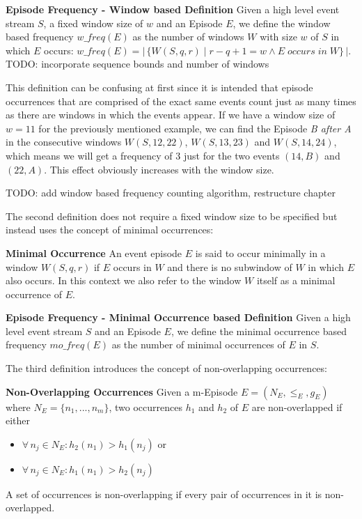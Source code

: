 \begin{mydef}
\textbf{Episode Frequency - Window based Definition} Given a high level event stream $S$, a fixed window size of $w$ and an Episode $E$, we define the window based frequency $w\_freq(E)$ as the number of windows $W$ with size $w$ of $S$ in which $E$ occurs: $w\_freq(E) = |\,\{W(S,q,r) \mid r-q+1 = w \land E \;occurs\; in\; W \}\,|$. TODO: incorporate sequence bounds and number of windows
\end{mydef}

This definition can be confusing at first since it is intended that episode occurrences that are comprised of the exact same events count just as many times as there are windows in which the events appear. If we have a window size of $w=11$ for the previously mentioned example, we can find the Episode \textit{B after A} in the consecutive windows $W(S,12,22)$, $W(S,13,23)$ and $W(S,14,24)$, which means we will get a frequency of $3$ just for the two events $(14,B)$ and $(22,A)$. This effect obviously increases with the window size. \newline

TODO: add window based frequency counting algorithm, restructure chapter




The second definition does not require a fixed window size to be specified but instead uses the concept of minimal occurrences:

\begin{mydef}
\textbf{Minimal Occurrence} An event episode $E$ is said to occur minimally in a window $W(S,q,r)$ if $E$ occurs in $W$ and there is no subwindow of $W$ in which $E$ also occurs. In this context we also refer to the window $W$ itself as a minimal occurrence of $E$.
\end{mydef}

\begin{mydef}
\textbf{Episode Frequency - Minimal Occurrence based Definition} Given a high level event stream $S$ and an Episode $E$, we define the minimal occurrence based frequency $mo\_freq(E)$ as the number of minimal occurrences of $E$ in $S$.
\end{mydef}

The third definition introduces the concept of non-overlapping occurrences:

\begin{mydef}
\textbf{Non-Overlapping Occurrences} Given a m-Episode $E = (N_E,{\leq}_{E},g_E)$ where $N_E = \{n_1,...,n_m\}$, two occurrences $h_1$ and $h_2$ of $E$ are non-overlapped if either 
\begin{itemize}
	\item $\forall \, n_j \in N_E : h_2(n_1)>h_1(n_j)$ or 
	\item $\forall \, n_j \in N_E : h_1(n_1)>h_2(n_j)$
\end{itemize}
A set of occurrences is non-overlapping if every pair of occurrences in it is non-overlapped.
\end{mydef}

